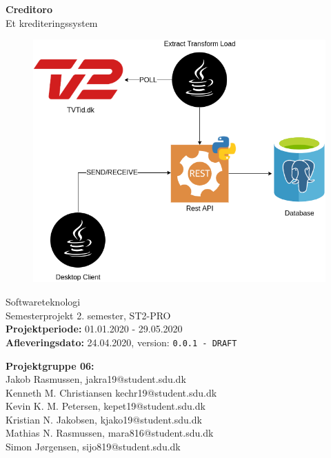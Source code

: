 \begin{titlepage}
\begin{center}
{ \LARGE \bfseries Creditoro \\[0.4cm]}
Et krediteringssystem
\begin{figure}[H]
\centering 
\includegraphics[scale=0.5]{figures/creditoro.png}
\label{figure:creditoro_system}
\end{figure}

Softwareteknologi\\
\vspace{2mm}
Semesterprojekt 2. semester, ST2-PRO\\
\vspace{2mm}
\textbf{Projektperiode:} 01.01.2020 - 29.05.2020 \\
\vspace{2mm}
\textbf{Afleveringsdato:} 24.04.2020, version: \texttt{0.0.1 - DRAFT} \\

\vspace{7mm}

\textbf{Projektgruppe 06:} \\
\vspace{2mm}
Jakob Rasmussen, jakra19@student.sdu.dk \\
\vspace{2mm}
Kenneth M. Christiansen kechr19@student.sdu.dk \\
\vspace{2mm}
Kevin K. M. Petersen, kepet19@student.sdu.dk \\
\vspace{2mm}
Kristian N. Jakobsen, kjako19@student.sdu.dk \\
\vspace{2mm}
Mathias N. Rasmussen, mara816@student.sdu.dk \\
\vspace{2mm}
Simon Jørgensen, sijo819@student.sdu.dk \\


\end{center}
\end{titlepage}
